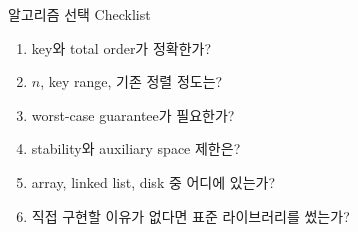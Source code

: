 \begin{frame}{알고리즘 선택 Checklist}
\begin{enumerate}\item key와 total order가 정확한가?\item $n$, key range, 기존 정렬 정도는?\item worst-case guarantee가 필요한가?\item stability와 auxiliary space 제한은?\item array, linked list, disk 중 어디에 있는가?\item 직접 구현할 이유가 없다면 표준 라이브러리를 썼는가?\end{enumerate}
\vfill{}
\end{frame}
